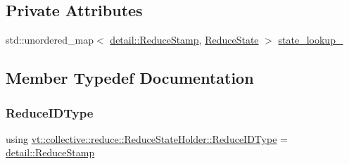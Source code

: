 \subsection*{Private Attributes}
\begin{DoxyCompactItemize}
\item 
std\+::unordered\+\_\+map$<$ \hyperlink{namespacevt_1_1collective_1_1reduce_1_1detail_abcd205dec83706f347d55c7528bf2664}{detail\+::\+Reduce\+Stamp}, \hyperlink{structvt_1_1collective_1_1reduce_1_1_reduce_state}{Reduce\+State} $>$ \hyperlink{structvt_1_1collective_1_1reduce_1_1_reduce_state_holder_ab30bde72498ebf851969c1914c3378c6}{state\+\_\+lookup\+\_\+}
\end{DoxyCompactItemize}


\subsection{Member Typedef Documentation}
\mbox{\label{structvt_1_1collective_1_1reduce_1_1_reduce_state_holder_ac75b7127c84d699f42c0bc3f3b02bb0b}} 
\subsubsection{\texorpdfstring{Reduce\+I\+D\+Type}{ReduceIDType}}
{\footnotesize\ttfamily using \hyperlink{structvt_1_1collective_1_1reduce_1_1_reduce_state_holder_ac75b7127c84d699f42c0bc3f3b02bb0b}{vt\+::collective\+::reduce\+::\+Reduce\+State\+Holder\+::\+Reduce\+I\+D\+Type} =  \hyperlink{namespacevt_1_1collective_1_1reduce_1_1detail_abcd205dec83706f347d55c7528bf2664}{detail\+::\+Reduce\+Stamp}}

\mbox{\label{structvt_1_1collective_1_1reduce_1_1_reduce_state_holder_a4a87ec20428609cb6c8ec49c11893389}} 
